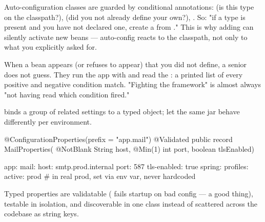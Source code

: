 Auto-configuration classes are guarded by conditional annotations:  (is this type on the classpath?),  (did you not already define your own?), . So: "if a  type is present and you have not declared one, create a  from ." This is why adding  can silently activate new beans — auto-config reacts to the classpath, not only to what you explicitly asked for.

\begin{seniornote}
When a bean appears (or refuses to appear) that you did not define, a senior does not guess. They run the app with  and read the : a printed list of every positive and negative condition match. "Fighting the framework" is almost always "not having read which condition fired."
\end{seniornote}


  binds a group of related settings to a typed object;  let the same jar behave differently per environment.

\begin{javabox}
@ConfigurationProperties(prefix = "app.mail")
@Validated
public record MailProperties(
    @NotBlank String host,
    @Min(1) int port,
    boolean tlsEnabled) {}
\end{javabox}

\begin{yamlbox}
app:
  mail:
    host: smtp.prod.internal
    port: 587
    tls-enabled: true
spring:
  profiles:
    active: prod   # in real prod, set via env var, never hardcoded
\end{yamlbox}

 Typed properties are validatable ( fails startup on bad config — a good thing), testable in isolation, and discoverable in one class instead of scattered across the codebase as string keys.


